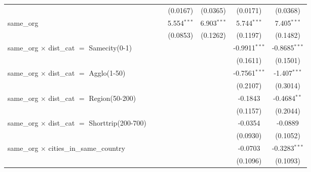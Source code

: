 \begin{tabular}{lcccccc}
                                                          &                 &                     & (0.0167)       & (0.0365)            & (0.0171)        & (0.0368)\\   
   same\_org                                              &                 &                     & 5.554$^{***}$  & 6.903$^{***}$       & 5.744$^{***}$   & 7.405$^{***}$\\   
                                                          &                 &                     & (0.0853)       & (0.1262)            & (0.1197)        & (0.1482)\\   
   same\_org $\times$ dist\_cat $=$ Samecity(0-1)         &                 &                     &                &                     & -0.9911$^{***}$ & -0.8685$^{***}$\\   
                                                          &                 &                     &                &                     & (0.1611)        & (0.1501)\\   
   same\_org $\times$ dist\_cat $=$ Agglo(1-50)           &                 &                     &                &                     & -0.7561$^{***}$ & -1.407$^{***}$\\   
                                                          &                 &                     &                &                     & (0.2107)        & (0.3014)\\   
   same\_org $\times$ dist\_cat $=$ Region(50-200)        &                 &                     &                &                     & -0.1843         & -0.4684$^{**}$\\   
                                                          &                 &                     &                &                     & (0.1157)        & (0.2044)\\   
   same\_org $\times$ dist\_cat $=$ Shorttrip(200-700)    &                 &                     &                &                     & -0.0354         & -0.0889\\   
                                                          &                 &                     &                &                     & (0.0930)        & (0.1052)\\   
   same\_org $\times$ cities\_in\_same\_country           &                 &                     &                &                     & -0.0703         & -0.3283$^{***}$\\   
                                                          &                 &                     &                &                     & (0.1096)        & (0.1093)\\   

\end{tabular}
